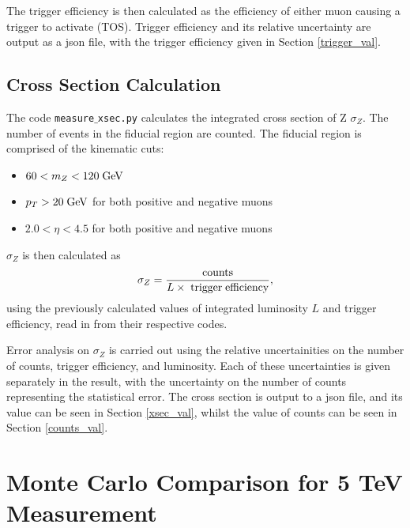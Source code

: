 \documentclass[a4paper]{article}
\begin{document}
The trigger efficiency is then calculated as the efficiency of either muon causing a trigger to activate (TOS).
Trigger efficiency and its relative uncertainty are output as a json file, with the trigger efficiency given in Section \ref{trigger_val}.

\subsection{Cross Section Calculation} \label{sec: Z xsec}
The code \texttt{measure$\_$xsec.py} calculates the integrated cross section of Z $\sigma_Z$.
The number of events in the fiducial region are counted. The fiducial region is comprised of the kinematic cuts:

\begin{itemize}
  \item $60 < m_Z < 120 \; {\rm GeV}$ 
  \item $p_T > 20 \; {\rm GeV}$ for both positive and negative muons
  \item $2.0 < \eta < 4.5$ for both positive and negative muons
\end{itemize}

$\sigma_Z$ is then calculated as
\begin{equation}
\sigma_Z = \frac{{\rm counts}}{L \times {\rm \; trigger \; efficiency}},
\end{equation}
using the previously calculated values of integrated luminosity $L$ and trigger efficiency, read in from their respective codes.

Error analysis on $\sigma_Z$ is carried out using the relative uncertainities on the number of counts, trigger efficiency, and luminosity. Each of these uncertainties is given separately in the result, with the uncertainty on the number of counts representing the statistical error. The cross section is output to a json file, and its value can be seen in Section \ref{xsec_val}, whilst the value of counts can be seen in Section \ref{counts_val}.

\section{Monte Carlo Comparison for 5 TeV Measurement} \label{Z histograms}
\end{document}

